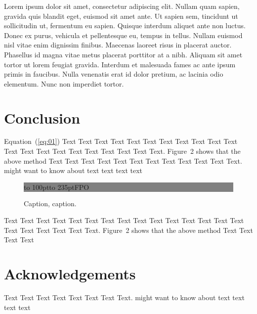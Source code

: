 \documentclass{bioinfo}
\begin{document}
Lorem ipsum dolor sit amet, consectetur adipiscing elit. Nullam quam sapien, gravida quis blandit eget, euismod sit amet ante. Ut sapien sem, tincidunt ut sollicitudin ut, fermentum eu sapien. Quisque interdum aliquet ante non luctus. Donec ex purus, vehicula et pellentesque eu, tempus in tellus. Nullam euismod nisl vitae enim dignissim finibus. Maecenas laoreet risus in placerat auctor. Phasellus id magna vitae metus placerat porttitor at a nibh. Aliquam sit amet tortor ut lorem feugiat gravida. Interdum et malesuada fames ac ante ipsum primis in faucibus. Nulla venenatis erat id dolor pretium, ac lacinia odio elementum. Nunc non imperdiet tortor.

\section{Conclusion}

Equation~(\ref{eq:01}) Text Text Text Text Text Text  Text Text
Text Text Text Text Text Text Text Text Text Text Text Text Text.
Figure~2\vphantom{\ref{fig:02}} shows that the above method  Text
Text Text Text  Text Text Text Text Text Text  Text Text.
\citealp{Boffelli03} might want to know about text text text text

\begin{figure}[!tpb]%
\fboxsep=0pt\colorbox{gray}{\begin{minipage}[t]{235pt} \vbox to 100pt{\vfill\hbox to
235pt{\hfill\fontsize{24pt}{24pt}\selectfont FPO\hfill}\vfill}
\end{minipage}}
\caption{Caption, caption.}\label{fig:01}
\end{figure}



Text Text Text Text Text Text  Text Text Text Text Text Text Text
Text Text  Text Text Text Text Text Text.
Figure~2\vphantom{\ref{fig:02}} shows that the above method  Text
Text Text Text\vspace*{-10pt}


\section*{Acknowledgements}

Text Text Text Text Text Text  Text Text.  \citealp{Boffelli03} might want to know about  text
text text text\vspace*{-12pt}
\end{document}
